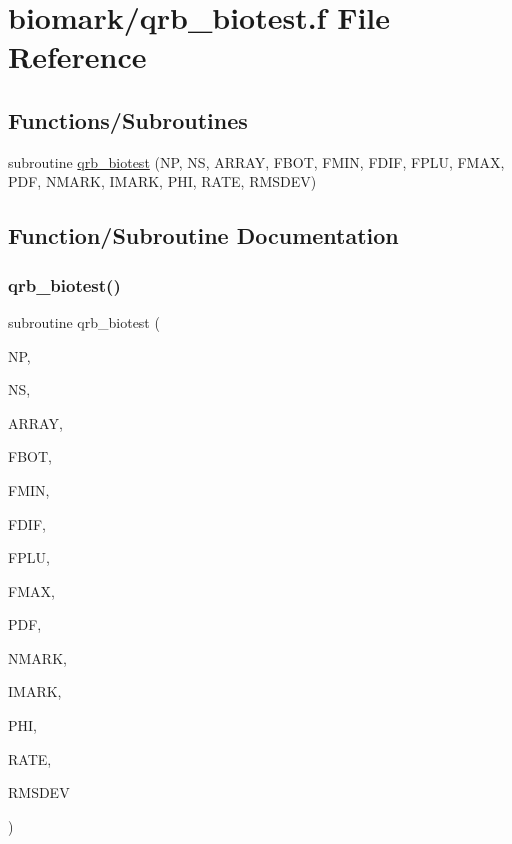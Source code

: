 \hypertarget{qrb__biotest_8f}{}\section{biomark/qrb\+\_\+biotest.f File Reference}
\label{qrb__biotest_8f}
\subsection*{Functions/\+Subroutines}
\begin{DoxyCompactItemize}
\item 
subroutine \hyperlink{qrb__biotest_8f_a0916b183e679ab162debbf75472077c4}{qrb\+\_\+biotest} (NP, NS, A\+R\+R\+AY, F\+B\+OT, F\+M\+IN, F\+D\+IF, F\+P\+LU, F\+M\+AX, P\+DF, N\+M\+A\+RK, I\+M\+A\+RK, P\+HI, R\+A\+TE, R\+M\+S\+D\+EV)
\end{DoxyCompactItemize}


\subsection{Function/\+Subroutine Documentation}
\mbox{\label{qrb__biotest_8f_a0916b183e679ab162debbf75472077c4}} 
\subsubsection{\texorpdfstring{qrb\+\_\+biotest()}{qrb\_biotest()}}
{\footnotesize\ttfamily subroutine qrb\+\_\+biotest (\begin{DoxyParamCaption}\item[{integer}]{NP,  }\item[{integer}]{NS,  }\item[{double precision, dimension(np,ns)}]{A\+R\+R\+AY,  }\item[{double precision, dimension(np)}]{F\+B\+OT,  }\item[{double precision, dimension(np)}]{F\+M\+IN,  }\item[{double precision, dimension(np)}]{F\+D\+IF,  }\item[{double precision, dimension(np)}]{F\+P\+LU,  }\item[{double precision, dimension(np)}]{F\+M\+AX,  }\item[{double precision, dimension(np)}]{P\+DF,  }\item[{integer}]{N\+M\+A\+RK,  }\item[{integer, dimension(nmark)}]{I\+M\+A\+RK,  }\item[{double precision, dimension(np,ns)}]{P\+HI,  }\item[{double precision, dimension(ns)}]{R\+A\+TE,  }\item[{double precision, dimension(ns)}]{R\+M\+S\+D\+EV }\end{DoxyParamCaption})}

